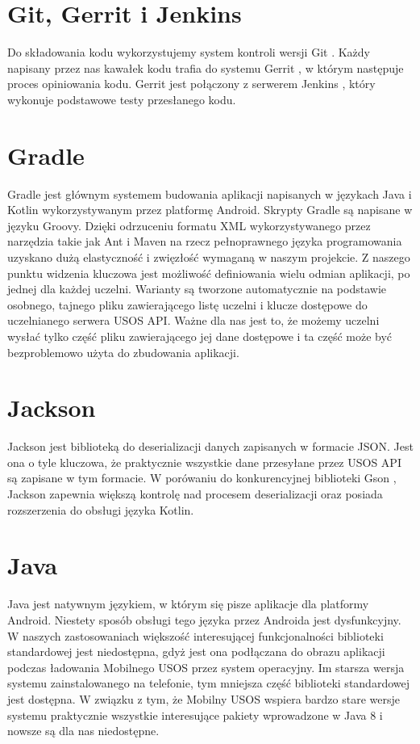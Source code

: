 \documentclass{pracamgr}
\begin{document}
\section{Git, Gerrit i Jenkins}

Do składowania kodu wykorzystujemy system kontroli wersji Git \cite{git}. Każdy
napisany przez nas kawałek kodu trafia do systemu Gerrit \cite{gerrit}, w którym
następuje proces opiniowania kodu. Gerrit jest połączony z serwerem Jenkins
\cite{jenkins}, który wykonuje podstawowe testy przesłanego kodu.

\section{Gradle}

Gradle \cite{gradle} jest głównym systemem budowania aplikacji napisanych w
językach Java i Kotlin wykorzystywanym przez platformę Android. Skrypty Gradle
są napisane w języku Groovy. Dzięki odrzuceniu formatu XML wykorzystywanego przez
narzędzia takie jak Ant i Maven na rzecz pełnoprawnego języka programowania
uzyskano dużą elastyczność i zwięzłość wymaganą w naszym projekcie. Z naszego
punktu widzenia kluczowa jest możliwość definiowania wielu odmian aplikacji, po
jednej dla każdej uczelni. Warianty są tworzone automatycznie na podstawie osobnego,
tajnego pliku zawierającego listę uczelni i klucze dostępowe do uczelnianego serwera
USOS API. Ważne dla nas jest to, że możemy uczelni wysłać tylko część pliku zawierającego
jej dane dostępowe i ta część może być bezproblemowo użyta do zbudowania aplikacji.

\section{Jackson}

Jackson \cite{jackson} jest biblioteką do deserializacji danych zapisanych w
formacie JSON. Jest ona o tyle kluczowa, że praktycznie wszystkie dane przesyłane
przez USOS API są zapisane w tym formacie. W porówaniu do konkurencyjnej biblioteki
Gson \cite{gson}, Jackson zapewnia większą kontrolę nad procesem deserializacji
oraz posiada rozszerzenia do obsługi języka Kotlin.

\section{Java}

Java \cite{java} jest natywnym językiem, w którym się pisze aplikacje dla platformy
Android. Niestety sposób obsługi tego języka przez Androida jest dysfunkcyjny.
W naszych zastosowaniach większość interesującej funkcjonalności biblioteki
standardowej jest niedostępna, gdyż jest ona podłączana do obrazu aplikacji podczas
ładowania Mobilnego USOS przez system operacyjny. Im starsza wersja systemu
zainstalowanego na telefonie, tym mniejsza część biblioteki standardowej jest
dostępna. W związku z tym, że Mobilny USOS wspiera bardzo stare wersje systemu
praktycznie wszystkie interesujące pakiety wprowadzone w Java 8 i nowsze są dla
nas niedostępne.
\end{document}

